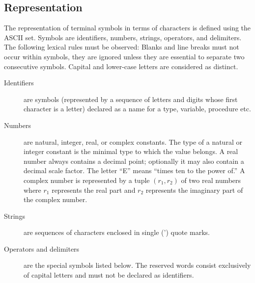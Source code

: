 \subsection*{Representation}

The representation of terminal symbols in terms of characters is
defined using the ASCII set. Symbols are identifiers, numbers,
strings, operators, and delimiters. The following lexical rules must
be observed: Blanks and line breaks must not occur within symbols,
they are ignored unless they are essential to separate two consecutive
symbols. Capital and lower-case letters are considered as distinct.

\begin{description}

\item[Identifiers] are symbols (represented by a sequence of letters
and digits whose first character is a letter) declared as a name for a
type, variable, procedure etc.

\item[Numbers] are natural, integer, real, or complex
constants. The type of a natural or  integer constant is the minimal
type to which the value belongs. A real number always contains a
decimal point; optionally it may also contain a decimal scale factor.
The letter ``E'' means ``times ten to the power of.'' A complex number
is represented by a tuple $(r_1, r_2)$ of two real numbers where $r_1$
represents the real part and $r_2$ represents the imaginary part of
the complex number.

\item[Strings] are sequences of characters enclosed in single (')
quote marks.

\item[Operators and delimiters] are the special symbols listed
below. The reserved words consist exclusively of capital letters and
must not be declared as identifiers.


\end{description}
